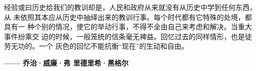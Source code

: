 \begin{dedications}

  经验或曰历史给我们的教训却是，人民和政府从来就没有从历史中学到任何东西，从
  未依照其本应从历史中抽绎出来的教训行事。每个时代都有它特殊的处境，都具有一
  种个别的情况，使它的举动行事，不得不全由自己来考虑和解决。当重大事件纷乘交
  迫的时候，一般笼统的信条毫无裨益。回忆过去的同样情形，也是徒劳无功的。一个
  灰色的回忆不能抗衡“现在”的生动和自由。

  \vspace{\baselineskip} \raggedleft \Large \bfseries —— 乔治·威廉·弗
  里德里希·黑格尔
\end{dedications}
